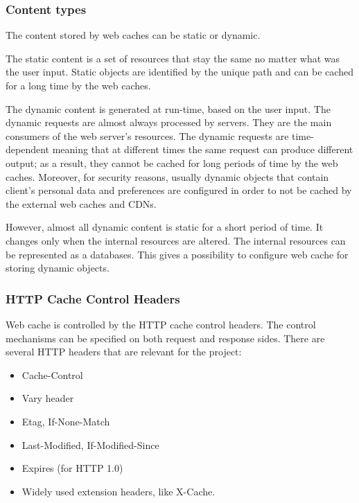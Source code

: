\subsubsection{Content types}


The content stored by web caches can be static or dynamic.

The static content is a set of resources that stay the same no matter what was the user input. Static objects are identified by the unique path and can be cached for a long time by the web caches.

The dynamic content is generated at run-time, based on the user input\cite{DynamicWebCaching}. The dynamic requests are almost always processed by servers. They are the main consumers of the web server's resources. The dynamic requests are time-dependent meaning that at different times the same request can produce different output; as a result, they cannot be cached for long periods of time by the web caches. Moreover, for security reasons, usually dynamic objects that contain client's personal data and preferences are configured in order to not be cached by the external web caches and CDNs.

However, almost all dynamic content is static for a short period of time. It changes only when the internal resources are altered. The internal resources can be represented as a databases. This gives a possibility to configure web cache for storing dynamic objects.

\subsubsection{HTTP Cache Control Headers}

Web cache is controlled by the HTTP cache control headers\cite{RFC7234}. The control mechanisms can be specified on both request and response sides. There are several HTTP headers that are relevant for the project: 
\begin{itemize}
    \item Cache-Control
    \item Vary header
    \item Etag, If-None-Match
    \item Last-Modified, If-Modified-Since
    \item Expires (for HTTP 1.0)
    \item Widely used extension headers, like X-Cache.
\end{itemize}

